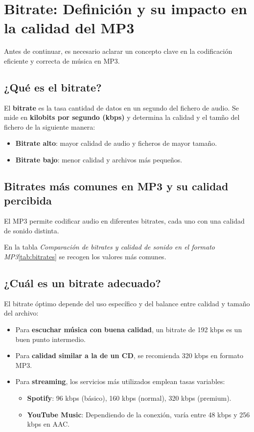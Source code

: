 \section{Bitrate: Definición y su impacto en la calidad del MP3}

Antes de continuar, es necesario aclarar un concepto clave en la codificación eficiente y correcta de música en MP3.

\subsection{¿Qué es el bitrate?}
El \textbf{bitrate} es la tasa cantidad de datos en un segundo del fichero de audio. Se mide en \textbf{kilobits por segundo (kbps)} y determina la calidad y el tamño del fichero de la siguiente manera:
\begin{itemize}
    \item \textbf{Bitrate alto}: mayor calidad de audio y ficheros de mayor tamaño.
    \item \textbf{Bitrate bajo}: menor calidad y archivos más pequeños.
\end{itemize}

\subsection{Bitrates más comunes en MP3 y su calidad percibida}
El MP3 permite codificar audio en diferentes bitrates, cada uno con una calidad de sonido distinta.



En la tabla \emph{Comparación de bitrates y calidad de sonido en el formato MP3}\ref{tab:bitrates} se recogen los valores más comunes.

\subsection{¿Cuál es un bitrate adecuado?}
El bitrate óptimo depende del uso específico y del balance entre calidad y tamaño del archivo:

\begin{itemize}
    \item Para \textbf{escuchar música con buena calidad}, un bitrate de 192 kbps es un buen punto intermedio.
    \item Para \textbf{calidad similar a la de un CD}, se recomienda 320 kbps en formato MP3.
    \item Para \textbf{streaming}, los servicios más utilizados emplean tasas variables:
    \begin{itemize}
        \item \textbf{Spotify}: 96 kbps (básico), 160 kbps (normal), 320 kbps (premium).
        \item \textbf{YouTube Music}: Dependiendo de la conexión, varía entre 48 kbps y 256 kbps en AAC.
    \end{itemize}
\end{itemize}

